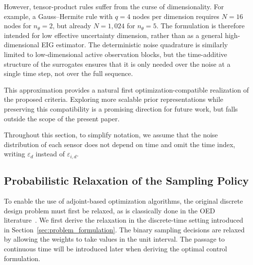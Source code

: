 \documentclass[a4paper,11pt]{article}
\begin{document}
However, tensor-product rules suffer from the curse of dimensionality. For
example, a Gauss--Hermite rule with \(q=4\) nodes per dimension requires
\(N=16\) nodes for \(n_\theta=2\), but already \(N=1{,}024\) for
\(n_\theta=5\). The formulation is therefore intended for low
effective uncertainty dimension, rather than as a general high-dimensional
EIG estimator. The deterministic noise quadrature is similarly limited to low-dimensional
active observation blocks, but the time-additive structure of the surrogates
ensures that it is only needed over the noise at a single time step, not
over the full sequence.


This approximation provides a natural first optimization-compatible realization of the proposed criteria. Exploring more scalable prior representations while preserving this compatibility is a promising direction for future work, but falls outside the scope of the present paper.

Throughout this section, to simplify notation, we assume that the noise distribution of each sensor does not depend on time and omit the time index, writing $\varepsilon_d$ instead of $\varepsilon_{i,d}$.

\subsection{Probabilistic Relaxation of the Sampling Policy} \label{subsec:relaxation}

To enable the use of adjoint-based optimization algorithms, the original discrete design problem must first be relaxed, as is classically done in the OED literature~\cite{Huan_Jagalur_Marzouk_2024}. We first derive the relaxation in the discrete-time setting introduced in Section~\ref{sec:problem_formulation}. The binary sampling decisions are relaxed by allowing the weights to take values in the unit interval. The passage to continuous time will be introduced later when deriving the optimal control formulation.
\end{document}
